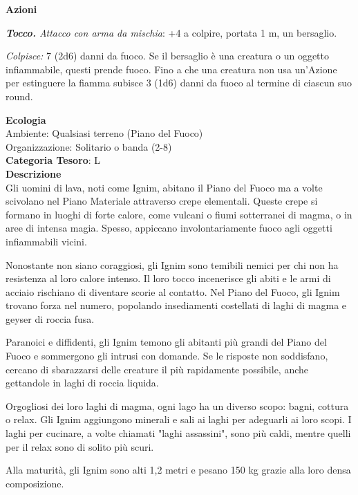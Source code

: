 \begin{multicols}{2}
{\textbf{Azioni}

\emph{\textbf{Tocco.} Attacco con arma da mischia}: +4 a colpire, portata 1 m, un bersaglio.

\emph{Colpisce:} 7 (2d6) danni da fuoco. Se il bersaglio è una creatura o un oggetto infiammabile, questi prende fuoco. Fino a che una creatura non usa un'Azione per estinguere la fiamma subisce 3 (1d6) danni da fuoco al termine di ciascun suo round.

\textbf{Ecologia}\\
Ambiente: Qualsiasi terreno (Piano del Fuoco)\\
Organizzazione: Solitario o banda (2-8)\\
\textbf{Categoria Tesoro}: L\\
\textbf{Descrizione}\\
Gli uomini di lava, noti come Ignim, abitano il Piano del Fuoco ma a volte scivolano nel Piano Materiale attraverso crepe elementali. Queste crepe si formano in luoghi di forte calore, come vulcani o fiumi sotterranei di magma, o in aree di intensa magia. Spesso, appiccano involontariamente fuoco agli oggetti infiammabili vicini.

Nonostante non siano coraggiosi, gli Ignim sono temibili nemici per chi non ha resistenza al loro calore intenso. Il loro tocco incenerisce gli abiti e le armi di acciaio rischiano di diventare scorie al contatto. Nel Piano del Fuoco, gli Ignim trovano forza nel numero, popolando insediamenti costellati di laghi di magma e geyser di roccia fusa.

Paranoici e diffidenti, gli Ignim temono gli abitanti più grandi del Piano del Fuoco e sommergono gli intrusi con domande. Se le risposte non soddisfano, cercano di sbarazzarsi delle creature il più rapidamente possibile, anche gettandole in laghi di roccia liquida.

Orgogliosi dei loro laghi di magma, ogni lago ha un diverso scopo: bagni, cottura o relax. Gli Ignim aggiungono minerali e sali ai laghi per adeguarli ai loro scopi. I laghi per cucinare, a volte chiamati "laghi assassini", sono più caldi, mentre quelli per il relax sono di solito più scuri.

Alla maturità, gli Ignim sono alti 1,2 metri e pesano 150 kg grazie alla loro densa composizione.

}
\end{multicols}
